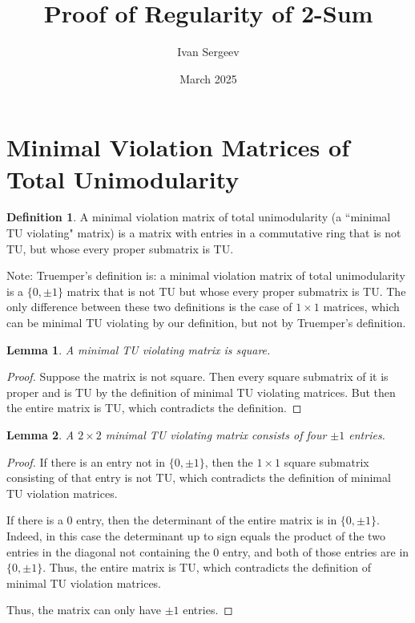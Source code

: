 \documentclass{article}
\title{Proof of Regularity of 2-Sum}
\author{Ivan Sergeev}
\date{March 2025}
\newtheorem{lemma}{Lemma}
\theoremstyle{definition}
\newtheorem{definition}{Definition}
\begin{document}
\maketitle

\section{Minimal Violation Matrices of Total Unimodularity}

\begin{definition}
    A minimal violation matrix of total unimodularity (a ``minimal TU violating" matrix) is a matrix with entries in a commutative ring that is not TU, but whose every proper submatrix is TU.
\end{definition}

Note: Truemper's definition is: a minimal violation matrix of total unimodularity is a $\{0, \pm 1\}$ matrix that is not TU but whose every proper submatrix is TU. The only difference between these two definitions is the case of $1 \times 1$ matrices, which can be minimal TU violating by our definition, but not by Truemper's definition.

\begin{lemma}
    A minimal TU violating matrix is square.
\end{lemma}

\begin{proof}
    Suppose the matrix is not square. Then every square submatrix of it is proper and is TU by the definition of minimal TU violating matrices. But then the entire matrix is TU, which contradicts the definition.
\end{proof}

\begin{lemma}
    A $2 \times 2$ minimal TU violating matrix consists of four $\pm 1$ entries.
\end{lemma}

\begin{proof}
    If there is an entry not in $\{0, \pm 1\}$, then the $1 \times 1$ square submatrix consisting of that entry is not TU, which contradicts the definition of minimal TU violation matrices.

    If there is a $0$ entry, then the determinant of the entire matrix is in $\{0, \pm 1\}$. Indeed, in this case the determinant up to sign equals the product of the two entries in the diagonal not containing the $0$ entry, and both of those entries are in $\{0, \pm 1\}$. Thus, the entire matrix is TU, which contradicts the definition of minimal TU violation matrices.

    Thus, the matrix can only have $\pm 1$ entries.
\end{proof}
\end{document}
